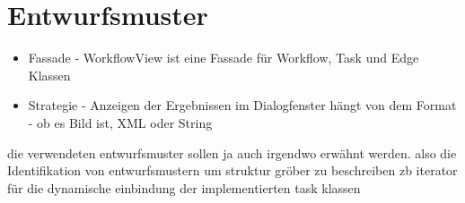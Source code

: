 	\section{Entwurfsmuster}
	
	\begin{itemize}
	    \item Fassade - WorkflowView ist eine Fassade für Workflow, Task und Edge Klassen
	    \item Strategie - Anzeigen der Ergebnissen im Dialogfenster hängt von dem Format - ob es Bild ist, XML oder String 
	\end{itemize}
	
	die verwendeten entwurfsmuster sollen ja auch irgendwo erwähnt werden.
	also die Identifikation von entwurfsmustern um struktur gröber zu beschreiben
	zb iterator für die dynamische einbindung der implementierten task klassen
